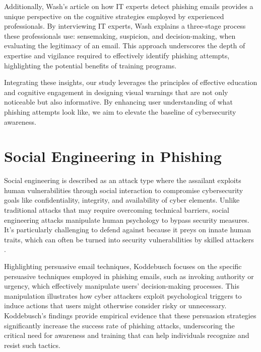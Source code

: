 \documentclass[
  a4paper,  %
  twoside,  %
  bibliography=totoc,
  headsepline,
  cleardoublepage=empty,
  parskip=half,
  draft=false
]{scrbook}
\begin{document}
Additionally, Wash's article \cite{wash} on how IT experts detect phishing emails provides a unique perspective on the cognitive strategies employed by experienced professionals. By interviewing IT experts, Wash explains a three-stage process these professionals use: sensemaking, suspicion, and decision-making, when evaluating the legitimacy of an email. This approach underscores the depth of expertise and vigilance required to effectively identify phishing attempts, highlighting the potential benefits of training programs.

Integrating these insights, our study leverages the principles of effective education and cognitive engagement in designing visual warnings that are not only noticeable but also informative. By enhancing user understanding of what phishing attempts look like, we aim to elevate the baseline of cybersecurity awareness.

\section{Social Engineering in Phishing}
Social engineering is described as an attack type where the assailant exploits human vulnerabilities through social interaction to compromise cybersecurity goals like confidentiality, integrity, and availability of cyber elements. Unlike traditional attacks that may require overcoming technical barriers, social engineering attacks manipulate human psychology to bypass security measures. It's particularly challenging to defend against because it preys on innate human traits, which can often be turned into security vulnerabilities by skilled attackers \cite{Wang2021}.


Highlighting persuasive email techniques, Koddebusch \cite{koddebusch} focuses on the specific persuasive techniques employed in phishing emails, such as invoking authority or urgency, which effectively manipulate users' decision-making processes. This manipulation illustrates how cyber attackers exploit psychological triggers to induce actions that users might otherwise consider risky or unnecessary. Koddebusch's findings provide empirical evidence that these persuasion strategies significantly increase the success rate of phishing attacks, underscoring the critical need for awareness and training that can help individuals recognize and resist such tactics. 
\end{document}
